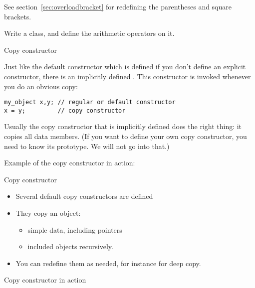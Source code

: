 See section~\ref{sec:overloadbracket} for redefining the parentheses
and square brackets.

\begin{exercise}
  Write a  class, and define the arithmetic operators on it.
\end{exercise}

 {Copy constructor}

Just like the default constructor which is defined if you don't define
an explicit constructor, there is an implicitly defined
. This constructor is invoked whenever
you do an obvious copy:
\begin{lstlisting}
my_object x,y; // regular or default constructor
x = y;         // copy constructor
\end{lstlisting}
Usually the copy constructor that is implicitly defined does the right
thing: it copies all data members. (If you want to define your own copy
constructor, you need to know its prototype. We will not go into that.)

Example of the copy constructor in action:
%

\begin{slide}{Copy constructor}
  \label{sl:class-copy}
  \begin{multicols}{2}
    \begin{itemize}
    \item
      Several default copy constructors are defined
    \item They copy an object:
      \begin{itemize}
      \item simple data, including pointers
      \item included objects recursively.
      \end{itemize}
    \item You can redefine them as needed, for instance for deep copy.
    \end{itemize}
    \vfill\columnbreak
  \end{multicols}
\end{slide}

\begin{slide}{Copy constructor in action}
  \label{sl:class-copy-out}
\end{slide}

